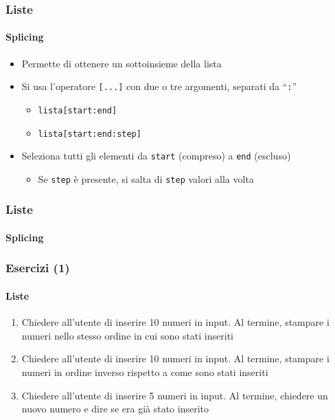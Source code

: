\begin{contentframe}
    \frametitle{Liste}
    \framesubtitle{Splicing}

    \begin{itemize}
        \item Permette di ottenere un sottoinsieme della lista
    
        \bigskip
        \item Si usa l'operatore \texttt{[...]} con due o tre argomenti, separati da ``\texttt{:}''
        \begin{itemize}
            \item \texttt{lista[start:end]}
            \item \texttt{lista[start:end:step]}
        \end{itemize}
        
        \item Seleziona tutti gli elementi da \texttt{start} (compreso) a \texttt{end} (escluso)
        \begin{itemize}
            \item Se \texttt{step} è presente, si salta di \texttt{step} valori alla volta
        \end{itemize}
    \end{itemize}
\end{contentframe}

\begin{contentframe}
    \frametitle{Liste}
    \framesubtitle{Splicing}

\end{contentframe}

\begin{exerciseframe}
    \frametitle{Esercizi (1)}
    \framesubtitle{Liste}

    \begin{enumerate}
        \item Chiedere all'utente di inserire 10 numeri in input. Al termine, stampare i numeri nello stesso ordine in cui sono stati inseriti

        \pause
        \bigskip
        \item Chiedere all'utente di inserire 10 numeri in input. Al termine, stampare i numeri in ordine inverso rispetto a come sono stati inseriti

        \pause
        \bigskip
        \item Chiedere all'utente di inserire 5 numeri in input. Al termine, chiedere un nuovo numero e dire se era già stato inserito
    \end{enumerate}
\end{exerciseframe}

